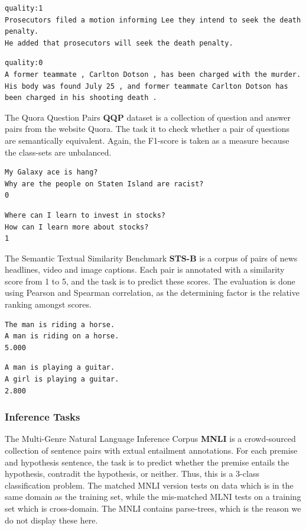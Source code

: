 \documentclass[a4paper,12pt,twoside,openright]{report}
\begin{document}
\begin{verbatim}
quality:1	
Prosecutors filed a motion informing Lee they intend to seek the death penalty.	
He added that prosecutors will seek the death penalty.
\end{verbatim}

\begin{verbatim}
quality:0	
A former teammate , Carlton Dotson , has been charged with the murder.	
His body was found July 25 , and former teammate Carlton Dotson has been charged in his shooting death .
\end{verbatim}

The Quora Question Pairs \textbf{QQP} \cite{shankar17} dataset is a collection of question and answer pairs from the website Quora. 
The task it to check whether a pair of questions are semantically equivalent.
Again, the F1-score is taken as a measure because the class-sets are unbalanced.


\begin{verbatim}
My Galaxy ace is hang?	
Why are the people on Staten Island are racist?	
0
\end{verbatim}

\begin{verbatim}
Where can I learn to invest in stocks?	
How can I learn more about stocks?	
1
\end{verbatim}

The Semantic Textual Similarity Benchmark \textbf{STS-B} \cite{cer2017} is a corpus of pairs of news headlines, video and image captions.
Each pair is annotated with a similarity score from 1 to 5, and the task is to predict these scores.
The evaluation is done using Pearson and Spearman correlation, as the determining factor is the relative ranking amongst scores.


\begin{verbatim}
The man is riding a horse.	
A man is riding on a horse.	
5.000
\end{verbatim}

\begin{verbatim}
A man is playing a guitar.
A girl is playing a guitar.	
2.800
\end{verbatim}

\subsubsection{Inference Tasks}

The Multi-Genre Natural Language Inference Corpus \textbf{MNLI} \cite{N18-1101} \cite{bowman2015} is a crowd-sourced collection of sentence pairs with extual entailment annotations.
For each premise and hypothesis sentence, the task is to predict whether the premise entails the hypothesis, contradit the hypothesis, or neither.
Thus, this is a 3-class classification problem.
The matched MNLI version tests on data which is in the same domain as the training set, while the mis-matched MLNI tests on a training set which is cross-domain.
The MNLI contains parse-trees, which is the reason we do not display these here.
\end{document}
